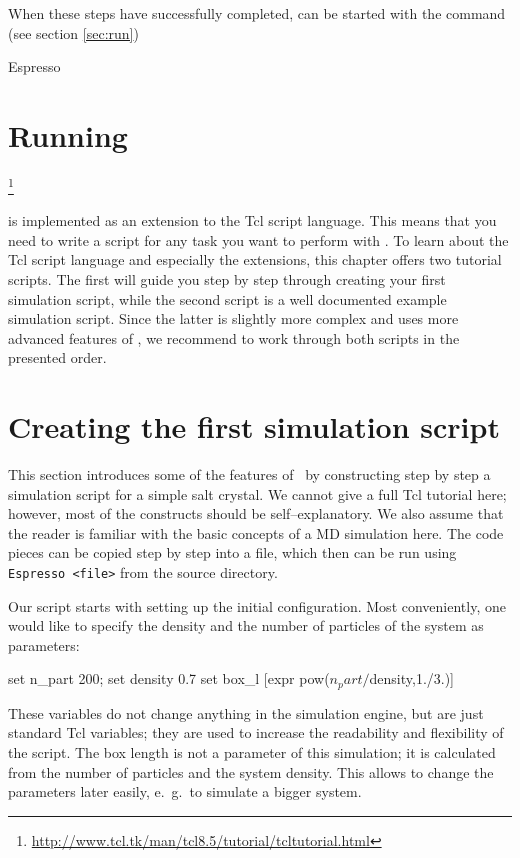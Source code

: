 When these steps have successfully completed, \es{} can be started
with the command (see section \vref{sec:run})
\begin{code}
Espresso
\end{code}

\section{Running \es}

\footnote{\url{http://www.tcl.tk/man/tcl8.5/tutorial/tcltutorial.html}}

\es{} is implemented as an extension to the Tcl script language. This means that you need to write a
script for any task you want to perform with \es. To learn about the Tcl script language and
especially the \es{} extensions, this chapter offers two tutorial scripts. The first will guide you
step by step through creating your first simulation script, while the second script is a well
documented example simulation script. Since the latter is slightly more complex and uses more
advanced features of \es{}, we recommend to work through both scripts in the presented order.

\section{Creating the first simulation script}

This section introduces some of the features of \es\ by
constructing step by step a simulation script for a simple salt crystal.
We cannot give a full Tcl tutorial here; however, most of the constructs
should be self--explanatory. We also assume that the reader is familiar with the
basic concepts of a MD simulation here. The code pieces can be copied step by
step into a file, which then can be run using \verb|Espresso <file>| from the
\es{} source directory.

Our script starts with setting up the initial configuration.  Most conveniently,
one would like to specify the density and the number of particles of the system
as parameters:
\begin{tclcode}
set n_part 200; set density 0.7
set box_l [expr pow($n_part/$density,1./3.)]
\end{tclcode}
These variables do not change anything in the simulation engine, but are just
standard Tcl variables; they are used to increase the readability and
flexibility of the script. The box length is not a parameter of this simulation;
it is calculated from the number of particles and the system density. This
allows to change the parameters later easily, e.~g.\ to simulate a bigger
system.

